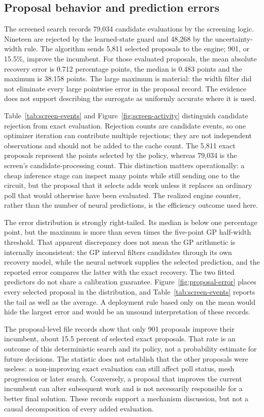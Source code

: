 \documentclass[10pt]{article}
\begin{document}
\subsection{Proposal behavior and prediction errors}
The screened search records 79,034 candidate evaluations by the screening logic. Nineteen are rejected by the learned-state guard and 48,268 by the uncertainty-width rule. The algorithm sends 5,811 selected proposals to the engine; 901, or 15.5\%, improve the incumbent. For those evaluated proposals, the mean absolute recovery error is 0.712 percentage points, the median is 0.483 points and the maximum is 38.158 points. The large maximum is material: the width filter did not eliminate every large pointwise error in the proposal record. The evidence does not support describing the surrogate as uniformly accurate where it is used.

Table~\ref{tab:screen-events} and Figure~\ref{fig:screen-activity} distinguish candidate rejection from exact evaluation. Rejection counts are candidate events, so one optimizer iteration can contribute multiple rejections; they are not independent observations and should not be added to the cache count. The 5,811 exact proposals represent the points selected by the policy, whereas 79,034 is the screen's candidate-processing count. This distinction matters operationally: a cheap inference stage can inspect many points while still sending one to the circuit, but the proposal that it selects adds work unless it replaces an ordinary poll that would otherwise have been evaluated. The realized engine counter, rather than the number of neural predictions, is the efficiency outcome used here.

The error distribution is strongly right-tailed. Its median is below one percentage point, but the maximum is more than seven times the five-point GP half-width threshold. That apparent discrepancy does not mean the GP arithmetic is internally inconsistent: the GP interval filters candidates through its own recovery model, while the neural network supplies the selected prediction, and the reported error compares the latter with the exact recovery. The two fitted predictors do not share a calibration guarantee. Figure~\ref{fig:proposal-error} places every selected proposal in the distribution, and Table~\ref{tab:screen-events} reports the tail as well as the average. A deployment rule based only on the mean would hide the largest error and would be an unsound interpretation of these records.

The proposal-level file records show that only 901 proposals improve their incumbent, about 15.5 percent of selected exact proposals. That rate is an outcome of this deterministic search and its policy, not a probability estimate for future decisions. The statistic does not establish that the other proposals were useless: a non-improving exact evaluation can still affect poll status, mesh progression or later search. Conversely, a proposal that improves the current incumbent can alter subsequent work and is not necessarily responsible for a better final solution. These records support a mechanism discussion, but not a causal decomposition of every added evaluation.
\end{document}
